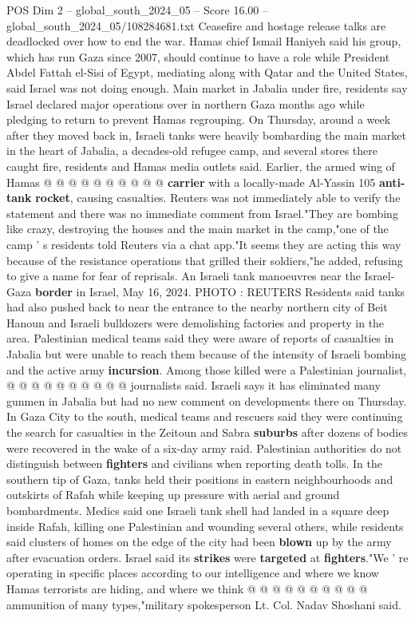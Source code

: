 \begin{textsample}{POS Dim 2 – global\_south\_2024\_05 – Score 16.00 – global\_south\_2024\_05/108284681.txt}
Ceasefire and hostage release talks are deadlocked over how to end the war.
Hamas chief Ismail Haniyeh said his group, which has run Gaza since 2007, should continue to have a role while President Abdel Fattah el-Sisi of Egypt, mediating along with Qatar and the United States, said Israel was not doing enough.
Main market in Jabalia under fire, residents say Israel declared major operations over in northern Gaza months ago while pledging to return to prevent Hamas regrouping.
On Thursday, around a week after they moved back in, Israeli tanks were heavily bombarding the main market in the heart of Jabalia, a decades-old refugee camp, and several stores there caught fire, residents and Hamas media outlets said.
Earlier, the armed wing of Hamas @ @ @ @ @ @ @ @ @ @ \textbf{carrier} with a locally-made Al-Yassin 105 \textbf{anti-tank} \textbf{rocket}, causing casualties.
Reuters was not immediately able to verify the statement and there was no immediate comment from Israel."They are bombing like crazy, destroying the houses and the main market in the camp,"one of the camp ' s residents told Reuters via a chat app."It seems they are acting this way because of the resistance operations that grilled their soldiers,"he added, refusing to give a name for fear of reprisals.
An Israeli tank manoeuvres near the Israel-Gaza \textbf{border} in Israel, May 16, 2024.
PHOTO : REUTERS Residents said tanks had also pushed back to near the entrance to the nearby northern city of Beit Hanoun and Israeli bulldozers were demolishing factories and property in the area.
Palestinian medical teams said they were aware of reports of casualties in Jabalia but were unable to reach them because of the intensity of Israeli bombing and the active army \textbf{incursion}.
Among those killed were a Palestinian journalist, @ @ @ @ @ @ @ @ @ @ journalists said.
Israeli says it has eliminated many gunmen in Jabalia but had no new comment on developments there on Thursday.
In Gaza City to the south, medical teams and rescuers said they were continuing the search for casualties in the Zeitoun and Sabra \textbf{suburbs} after dozens of bodies were recovered in the wake of a six-day army raid.
Palestinian authorities do not distinguish between \textbf{fighters} and civilians when reporting death tolls.
In the southern tip of Gaza, tanks held their positions in eastern neighbourhoods and outskirts of Rafah while keeping up pressure with aerial and ground bombardments.
Medics said one Israeli tank shell had landed in a square deep inside Rafah, killing one Palestinian and wounding several others, while residents said clusters of homes on the edge of the city had been \textbf{blown} up by the army after evacuation orders.
Israel said its \textbf{strikes} were \textbf{targeted} at \textbf{fighters}."We ' re operating in specific places according to our intelligence and where we know Hamas terrorists are hiding, and where we think @ @ @ @ @ @ @ @ @ @ ammunition of many types,"military spokesperson Lt.
Col.
Nadav Shoshani said.

\end{textsample}
